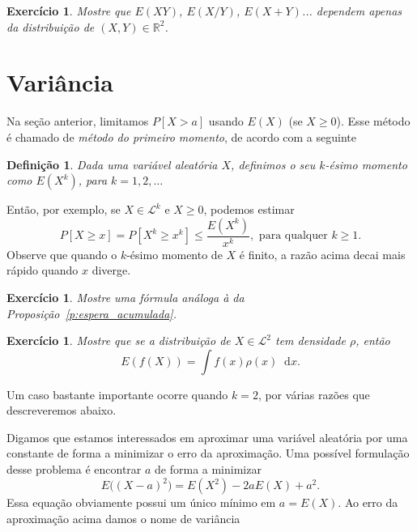 \documentclass[reqno]{article}
\newcommand*\1{\mathds{1}}
\newtheorem{definition}[theorem]{Definição}
\newtheorem{exercise}[example]{Exercício}
\renewcommand*\d{\mathop{}\!\mathrm{d}}
\begin{document}
\begin{exercise}
  Mostre que $E(XY)$, $E(X/Y)$, $E(X + Y)$... dependem apenas da distribuição de $(X,Y) \in \mathbb{R}^2$.
\end{exercise}

\section{Variância}


Na seção anterior, limitamos $P[X > a]$ usando $E(X)$ (se $X \geq 0$).
Esse método é chamado de \emph{método do primeiro momento}, de acordo com a seguinte
\begin{definition}
  Dada uma variável aleatória $X$, definimos o seu $k$-ésimo momento como $E(X^k)$, para $k = 1, 2, \dots$
\end{definition}

Então, por exemplo, se $X \in \mathcal{L}^k$ e $X \geq 0$, podemos estimar
\begin{equation}
  P[X \geq x] = P [X^k \geq x^k] \leq \frac{E(X^k)}{x^k}, \text{ para qualquer $k \geq 1$.}
\end{equation}
Observe que quando o $k$-ésimo momento de $X$ é finito, a razão acima decai mais rápido quando $x$ diverge.

\begin{exercise}
  Mostre uma fórmula análoga à da Proposição~\ref{p:espera_acumulada}.
\end{exercise}

\begin{exercise}
  Mostre que se a distribuição de $X \in \mathcal{L}^2$ tem densidade $\rho$, então
  \begin{equation}
    E(f(X)) = \int f(x) \rho(x) \d x.
  \end{equation}
\end{exercise}

Um caso bastante importante ocorre quando $k = 2$, por várias razões que descreveremos abaixo.

Digamos que estamos interessados em aproximar uma variável aleatória por uma constante de forma a minimizar o erro da aproximação.
Uma possível formulação desse problema é encontrar $a$ de forma a minimizar
\begin{equation}
  E\Big( (X - a)^2 \Big) = E(X^2) - 2 a E(X) + a^2.
\end{equation}
Essa equação obviamente possui um único mínimo em $a = E(X)$.
Ao erro da aproximação acima damos o nome de variância
\end{document}
